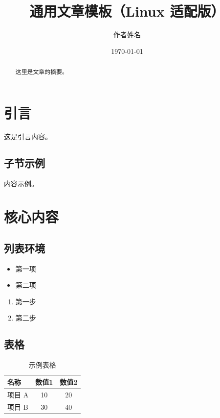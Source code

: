 \documentclass[12pt,a4paper]{article}
\title{\textbf{通用文章模板（Linux 适配版）}}
\author{作者姓名}
\date{\today}
\begin{document}
\maketitle

\begin{abstract}
这里是文章的摘要。
\end{abstract}

\tableofcontents
\newpage

\section{引言}
这是引言内容。

\subsection{子节示例}
内容示例。

\section{核心内容}
\label{sec:theory}
\subsection{列表环境}
\begin{itemize}
    \item 第一项
    \item 第二项
\end{itemize}

\begin{enumerate}
    \item 第一步
    \item 第二步
\end{enumerate}

\subsection{表格}
\begin{table}[H]
    \centering
    \caption{示例表格}
    \begin{tabular}{lcc}
        \toprule
        名称 & 数值1 & 数值2 \\
        \midrule
        项目 A & 10 & 20 \\
        项目 B & 30 & 40 \\
        \bottomrule
    \end{tabular}
    \label{tab:example}
\end{table}
\end{document}
